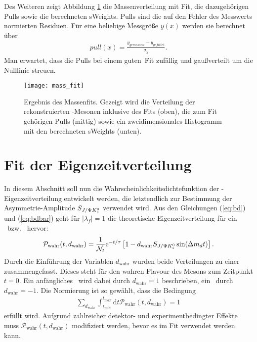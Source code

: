 Des Weiteren zeigt Abbildung \ref{fig:fit_masse} die Massenverteilung mit Fit, die dazugehörigen Pulls sowie die berechneten sWeights. Pulls sind die auf den Fehler des Messwerts normierten Residuen. Für eine beliebige Messgröße $y(x)$ werden sie berechnet über
\begin{align}
pull(x) = \frac{y_{gemessen}-y_{gefittet}}{\sigma_y}.
\end{align}
Man erwartet, dass die Pulls bei einem \glqq guten\grqq\ Fit zufällig und gaußverteilt um die Nulllinie streuen.

\begin{figure}[hptb]
\centering
\texttt{[image: mass\_fit]}
\caption{Ergebnis des Massenfits. Gezeigt wird die Verteilung der rekonstruierten \Bd-Mesonen inklusive des Fits (oben), die zum Fit gehörigen Pulls (mittig) sowie ein zweidimensionales Histogramm mit den berechneten sWeights (unten).}
\label{fig:fit_masse}
\end{figure}


\section{Fit der Eigenzeitverteilung} \label{kap:eigenzeitverteilung}
In diesem Abschnitt soll nun die Wahrscheinlichkeitsdichtefunktion der \Bd-Ei\-gen\-zeit\-ver\-tei\-lung entwickelt werden, die letztendlich zur Bestimmung der Asym\-me\-trie-Amplitude $S_{J/\Psi K_s^0}$ verwendet wird. Aus den Gleichungen (\ref{eq:bd}) und (\ref{eq:bdbar}) geht für $|\lambda_f|=1$ die theoretische Eigenzeitverteilung für ein \Bd\ bzw. \Bdbar\ hervor:
\begin{align}
\mathcal{P}_{\text{wahr}}(t, d_{\text{wahr}}) = \frac{1}{\mathcal{N}_t}\mathrm{e}^{-t/\tau}\left[1-d_{\text{wahr}}S_{J/\Psi K_s^0}\sin(\Delta m_d t)\right].
\end{align}
Durch die Einführung der Variablen $d_{\text{wahr}}$ wurden beide Verteilungen zu einer zusammengefasst. Dieses steht für den wahren Flavour des Mesons zum Zeitpunkt $t=0$. Ein anfängliches \Bd\ wird dabei durch $d_{\text{wahr}}=1$ beschrieben, ein \Bdbar\ durch $d_{\text{wahr}}=-1$. Die Normierung ist so gewählt, dass die Bedingung
\begin{align}
\sum_{d_{\text{wahr}}}\int_{t_{min}}^{t_{max}}\mathrm{d}t\mathcal{P}_{\text{wahr}}(t, d_{\text{wahr}}) = 1
\end{align}
erfüllt wird. Aufgrund zahlreicher detektor- und experimentbedingter Effekte muss $\mathcal{P}_{\text{wahr}}(t, d_{\text{wahr}})$ modifiziert werden, bevor es im Fit verwendet werden kann.

